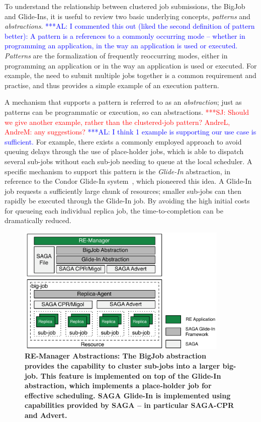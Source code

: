 \documentclass{rspublic}
\newcommand{\alnote}[1]{ {\textcolor{blue} { ***AL: #1 }}}
\newcommand{\jhanote}[1]{ {\textcolor{red} { ***SJ: #1 }}}
\newcommand{\alnote}[1]{}
\newcommand{\jhanote}[1]{}
\newcommand{\I}[1]{\textit{#1}}
\begin{document}
To understand the relationship between clustered job submissions, the
BigJob and Gli\-de-Ins, it is useful to review two basic
underlying concepts, \I{patterns} and \I{abstractions}.  \alnote{I
  commented this out (liked the second definition of pattern better):
  A pattern is a references to a commonly occurring mode -- whether in
  programming an application, in the way an application is used or
  executed.}  \I{Patterns} are the formalization of frequently
reoccurring modes, either in programming an application or in the way
an application is used or executed.
For example, the need to submit multiple jobs together is a common
requirement and practise, and thus provides a simple example of an
execution pattern.  

A mechanism that supports a pattern is referred to as an
\I{abstraction}; just as patterns can be programmatic or execution, so
can abstractions.  \jhanote{Should we give another example, rather
  than the clustered-job pattern? AndreL, AndreM: any suggestions?}
\alnote{I think 1 example is supporting our use case is sufficient.}
For example, there exists a commonly employed approach to avoid
queuing delays through the use of place-holder jobs, which is able to
dispatch several sub-jobs without each sub-job needing to queue at the
local scheduler. A specific mechanism to support this pattern is the
\emph{Glide-In} abstraction, in reference to the Condor Glide-In
system~\citep{citeulike:291860}, which pioneered this idea. A Glide-In
job requests a sufficiently large chunk of resources; smaller sub-jobs
can then rapidly be executed through the Glide-In job.  By avoiding
the high initial costs for queueing each individual replica job, the
time-to-completion can be dramatically reduced.

\begin{figure}[t]
      \centering
      \includegraphics[width=0.9\textwidth]{remdmanager_v12}   
      \caption{\footnotesize \bf RE-Manager Abstractions: The BigJob
        abstraction provides the capability to cluster sub-jobs into a
        larger big-job. This feature is implemented on top of the
        Glide-In abstraction, which %
        implements a place-holder job for effective scheduling.  SAGA
        Glide-In is implemented using capabilities provided by SAGA --
        in particular SAGA-CPR and Advert.}
      \label{fig:abstractions}
\end{figure}
\end{document}
